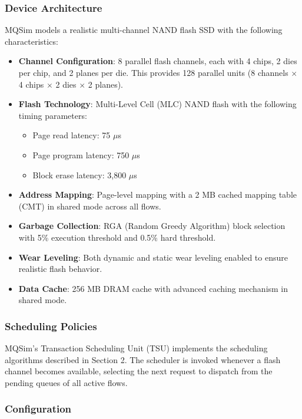 \documentclass[11pt]{article}
\begin{document}
\subsubsection{Device Architecture}

MQSim models a realistic multi-channel NAND flash SSD with the following characteristics:

\begin{itemize}
    \item \textbf{Channel Configuration}: 8 parallel flash channels, each with 4 chips, 2 dies per chip, and 2 planes per die. This provides 128 parallel units (8 channels $\times$ 4 chips $\times$ 2 dies $\times$ 2 planes).
    \item \textbf{Flash Technology}: Multi-Level Cell (MLC) NAND flash with the following timing parameters:
    \begin{itemize}
        \item Page read latency: 75 $\mu$s
        \item Page program latency: 750 $\mu$s
        \item Block erase latency: 3,800 $\mu$s
    \end{itemize}
    \item \textbf{Address Mapping}: Page-level mapping with a 2 MB cached mapping table (CMT) in shared mode across all flows.
    \item \textbf{Garbage Collection}: RGA (Random Greedy Algorithm) block selection with 5\% execution threshold and 0.5\% hard threshold.
    \item \textbf{Wear Leveling}: Both dynamic and static wear leveling enabled to ensure realistic flash behavior.
    \item \textbf{Data Cache}: 256 MB DRAM cache with advanced caching mechanism in shared mode.
\end{itemize}

\subsubsection{Scheduling Policies}

MQSim's Transaction Scheduling Unit (TSU) implements the scheduling algorithms described in Section 2. The scheduler is invoked whenever a flash channel becomes available, selecting the next request to dispatch from the pending queues of all active flows.

\subsubsection{Configuration}
\end{document}
